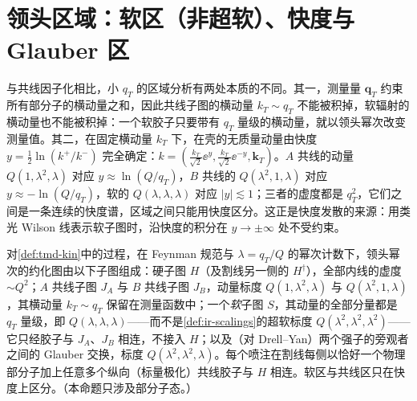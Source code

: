 \section{领头区域：软区（非超软）、快度与 Glauber 区}\label{sec:tmd-regions}

与共线因子化相比，小 $q_T$ 的区域分析有两处本质的不同。其一，测量量 $\mathbf q_T$ 约束所有部分子的横动量之和，因此共线子图的横动量 $k_T\sim q_T$ 不能被积掉，软辐射的横动量也不能被积掉：一个软胶子只要带有 $q_T$ 量级的横动量，就以领头幂次改变测量值。其二，在固定横动量 $k_T$ 下，在壳的无质量动量由快度 $y=\frac12\ln(k^+/k^-)$ 完全确定：$k=(\frac{k_T}{\sqrt2}\ee^{y},\frac{k_T}{\sqrt2}\ee^{-y},\mathbf k_T)$。$A$ 共线的动量 $Q(1,\lambda^2,\lambda)$ 对应 $y\approx\ln(Q/q_T)$，$B$ 共线的 $Q(\lambda^2,1,\lambda)$ 对应 $y\approx-\ln(Q/q_T)$，软的 $Q(\lambda,\lambda,\lambda)$ 对应 $|y|\lesssim1$；三者的虚度都是 $q_T^2$，它们之间是一条连续的快度谱，区域之间只能用快度区分。这正是快度发散的来源：用类光 Wilson 线表示软子图时，沿快度的积分在 $y\to\pm\infty$ 处不受约束。

\begin{proposition}\label{prop:tmd-regions}
对\cref{def:tmd-kin}中的过程，在 Feynman 规范与 $\lambda=q_T/Q$ 的幂次计数下，领头幂次的约化图由以下子图组成：硬子图 $H$（及割线另一侧的 $H^\dagger$），全部内线的虚度 $\sim Q^2$；$A$ 共线子图 $J_A$ 与 $B$ 共线子图 $J_B$，动量标度 $Q(1,\lambda^2,\lambda)$ 与 $Q(\lambda^2,1,\lambda)$，其横动量 $k_T\sim q_T$ 保留在测量函数中；一个\emph{软}子图 $S$，其动量的全部分量都是 $q_T$ 量级，即 $Q(\lambda,\lambda,\lambda)$——而不是\cref{def:ir-scalings}的超软标度 $Q(\lambda^2,\lambda^2,\lambda^2)$——它只经胶子与 $J_A$、$J_B$ 相连，不接入 $H$；以及（对 Drell--Yan）两个强子的旁观者之间的 Glauber 交换，标度 $Q(\lambda^2,\lambda^2,\lambda)$。每个喷注在割线每侧以恰好一个物理部分子加上任意多个纵向（标量极化）共线胶子与 $H$ 相连。软区与共线区只在快度上区分。（本命题只涉及部分子态。）
\end{proposition}

